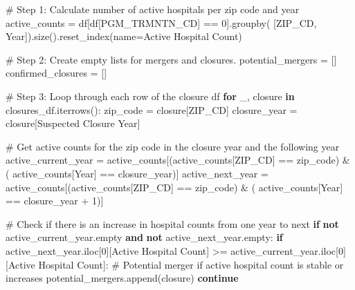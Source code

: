 \documentclass[
  letterpaper,
  DIV=11,
  numbers=noendperiod]{scrartcl}
\newenvironment{Shaded}{\begin{snugshade}}{\end{snugshade}}
\newcommand{\CommentTok}[1]{\textcolor[rgb]{0.37,0.37,0.37}{#1}}
\newcommand{\ControlFlowTok}[1]{\textcolor[rgb]{0.00,0.23,0.31}{\textbf{#1}}}
\newcommand{\DecValTok}[1]{\textcolor[rgb]{0.68,0.00,0.00}{#1}}
\newcommand{\KeywordTok}[1]{\textcolor[rgb]{0.00,0.23,0.31}{\textbf{#1}}}
\newcommand{\NormalTok}[1]{\textcolor[rgb]{0.00,0.23,0.31}{#1}}
\newcommand{\OperatorTok}[1]{\textcolor[rgb]{0.37,0.37,0.37}{#1}}
\newcommand{\StringTok}[1]{\textcolor[rgb]{0.13,0.47,0.30}{#1}}
\begin{document}
\begin{Shaded}
\begin{Highlighting}[]
\CommentTok{\# Step 1: Calculate number of active hospitals per zip code and year}
\NormalTok{active\_counts }\OperatorTok{=}\NormalTok{ df[df[}\StringTok{\textquotesingle{}PGM\_TRMNTN\_CD\textquotesingle{}}\NormalTok{] }\OperatorTok{==} \DecValTok{0}\NormalTok{].groupby(}
\NormalTok{    [}\StringTok{\textquotesingle{}ZIP\_CD\textquotesingle{}}\NormalTok{, }\StringTok{\textquotesingle{}Year\textquotesingle{}}\NormalTok{]).size().reset\_index(name}\OperatorTok{=}\StringTok{\textquotesingle{}Active Hospital Count\textquotesingle{}}\NormalTok{)}

\CommentTok{\# Step 2: Create empty lists for mergers and closures.}
\NormalTok{potential\_mergers }\OperatorTok{=}\NormalTok{ []}
\NormalTok{confirmed\_closures }\OperatorTok{=}\NormalTok{ []}

\CommentTok{\# Step 3: Loop through each row of the closure df}
\ControlFlowTok{for}\NormalTok{ \_, closure }\KeywordTok{in}\NormalTok{ closures\_df.iterrows():}
\NormalTok{    zip\_code }\OperatorTok{=}\NormalTok{ closure[}\StringTok{\textquotesingle{}ZIP\_CD\textquotesingle{}}\NormalTok{]}
\NormalTok{    closure\_year }\OperatorTok{=}\NormalTok{ closure[}\StringTok{\textquotesingle{}Suspected Closure Year\textquotesingle{}}\NormalTok{]}

    \CommentTok{\# Get active counts for the zip code in the closure year and the following year}
\NormalTok{    active\_current\_year }\OperatorTok{=}\NormalTok{ active\_counts[(active\_counts[}\StringTok{\textquotesingle{}ZIP\_CD\textquotesingle{}}\NormalTok{] }\OperatorTok{==}\NormalTok{ zip\_code) }\OperatorTok{\&}\NormalTok{ (}
\NormalTok{        active\_counts[}\StringTok{\textquotesingle{}Year\textquotesingle{}}\NormalTok{] }\OperatorTok{==}\NormalTok{ closure\_year)]}
\NormalTok{    active\_next\_year }\OperatorTok{=}\NormalTok{ active\_counts[(active\_counts[}\StringTok{\textquotesingle{}ZIP\_CD\textquotesingle{}}\NormalTok{] }\OperatorTok{==}\NormalTok{ zip\_code) }\OperatorTok{\&}\NormalTok{ (}
\NormalTok{        active\_counts[}\StringTok{\textquotesingle{}Year\textquotesingle{}}\NormalTok{] }\OperatorTok{==}\NormalTok{ closure\_year }\OperatorTok{+} \DecValTok{1}\NormalTok{)]}

    \CommentTok{\# Check if there is an increase in hospital counts from one year to next}
    \ControlFlowTok{if} \KeywordTok{not}\NormalTok{ active\_current\_year.empty }\KeywordTok{and} \KeywordTok{not}\NormalTok{ active\_next\_year.empty:}
        \ControlFlowTok{if}\NormalTok{ active\_next\_year.iloc[}\DecValTok{0}\NormalTok{][}\StringTok{\textquotesingle{}Active Hospital Count\textquotesingle{}}\NormalTok{] }\OperatorTok{\textgreater{}=}\NormalTok{ active\_current\_year.iloc[}\DecValTok{0}\NormalTok{][}\StringTok{\textquotesingle{}Active Hospital Count\textquotesingle{}}\NormalTok{]:}
            \CommentTok{\# Potential merger if active hospital count is stable or increases}
\NormalTok{            potential\_mergers.append(closure)}
            \ControlFlowTok{continue}


\end{Highlighting}
\end{Shaded}
\end{document}
